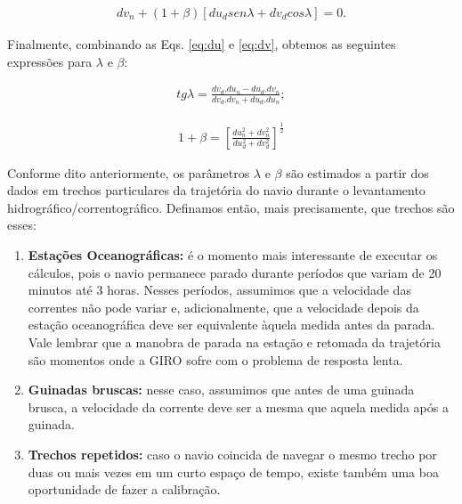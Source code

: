 \begin{eqnarray}
 dv_n + (1+\beta)[du_d sen\lambda + dv_d cos \lambda] = 0.
 \label{eq:dv}
\end{eqnarray}

Finalmente, combinando as Eqs. \ref{eq:du} e \ref{eq:dv}, obtemos as seguintes expressões para $\lambda$ e $\beta$:

\begin{eqnarray}
 tg \lambda = \frac{dv_d.du_n - du_d.dv_n}{dv_d.dv_n + du_d.du_n};
 \label{eq:lambda}
\end{eqnarray}

\begin{eqnarray}
 1+\beta = \left[ \frac{du_n^2 + dv_n^2}{du_d^2 + dv_d^2} \right]^\frac{1}{2}
 \label{eq:beta}
\end{eqnarray}


Conforme dito anteriormente, os parâmetros $\lambda$ e $\beta$ são estimados a partir dos dados em trechos particulares
da trajetória do navio durante o levantamento hidrográfico/cor\-ren\-to\-grá\-fi\-co. Definamos então, mais precisamente,
que trechos são esses:

\begin{enumerate}

 \item {\bf Estações Oceanográficas:} é o momento mais interessante de executar os cál\-cu\-los, pois o navio 
permanece parado durante períodos que variam de 20 minutos até 3 horas. Nesses períodos, assumimos que a 
velocidade das correntes não pode variar e, adicionalmente, que a velocidade depois da estação
oceanográfica deve ser equivalente àquela medida antes da parada. Vale lembrar que a manobra de parada na estação
e retomada da trajetória são momentos onde a GIRO sofre com o problema de resposta lenta.

\item {\bf Guinadas bruscas:} nesse caso, assumimos que antes de uma guinada brusca, a velocidade da corrente deve
ser a mesma que aquela medida após a guinada. 

\item {\bf Trechos repetidos:} caso o navio coincida de navegar o mesmo trecho por duas ou mais vezes em um curto 
espaço de tempo, existe também uma boa oportunidade de fazer a calibração.

\end{enumerate}

